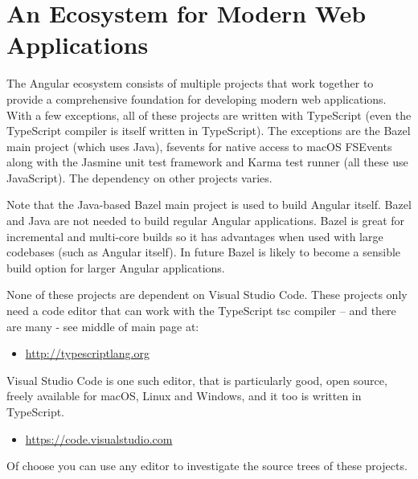 \section{An Ecosystem for Modern Web Applications}

The Angular ecosystem consists of multiple projects that work together to provide a
comprehensive foundation for developing modern web applications.  With a few
exceptions, all of these projects are written with TypeScript (even the TypeScript
compiler is itself written in TypeScript). The exceptions are the Bazel main project
(which uses Java), fsevents for native access to macOS FSEvents along with the
Jasmine unit test framework and Karma test runner (all these use JavaScript). The
dependency on other projects varies.

Note that the Java-based Bazel main project is used to build Angular itself. Bazel and
Java are not needed to build regular Angular applications. Bazel is great for
incremental and multi-core builds so it has advantages when used with large
codebases (such as Angular itself). In future Bazel is likely to become a sensible build
option for larger Angular applications.

None of these projects are dependent on Visual Studio Code. These projects only need
a code editor that can work with the TypeScript tsc compiler – and there are many -
see middle of main page at:

\begin{itemize}
  \item \url{http://typescriptlang.org}
\end{itemize}

Visual Studio Code is one such editor, that is particularly good, open source, freely
available for macOS, Linux and Windows, and it too is written in TypeScript.

\begin{itemize}
  \item \url{https://code.visualstudio.com}
\end{itemize}

Of choose you can use any editor to investigate the source trees of these projects.




